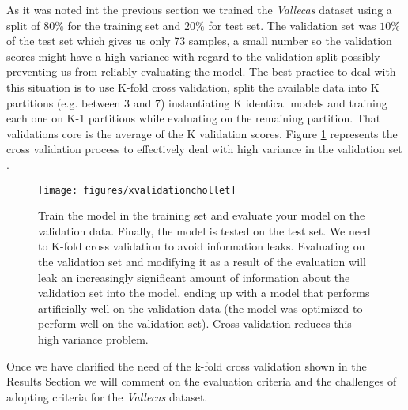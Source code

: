 \documentclass[11pt]{article}
\theoremstyle{definition}
\theoremstyle{remark}
\begin{document}
As it was noted int the previous section we trained the \emph{Vallecas} dataset using a split of $80\%$ for the training set and $20\%$ for test set. The validation set was $10\%$ of the test set which gives us only 73 samples, a small number so the validation scores might have a high variance with regard to the validation split possibly preventing us from reliably evaluating the model. The best practice to deal with this situation is to use K-fold cross validation, split the available data into K partitions (e.g. between 3 and 7) instantiating K identical models and training each one on K-1 partitions while evaluating on the remaining partition. That validations core is the average of the K validation scores. Figure \ref{fig:xvalchollet} represents the cross validation process to effectively deal with high variance in the validation set \cite{chollet2017deep}. 
\begin{figure}[H]
        \centering
        \texttt{[image: figures/xvalidationchollet]}
        \caption{Train the model in the training set and evaluate your model on the validation data. Finally, the model is tested on the test set. We need to K-fold cross validation to avoid information leaks. Evaluating on the validation set and modifying it as a result of the evaluation will leak an increasingly significant amount of information about the validation set into the model, ending up with a model that performs artificially well on the validation data (the model was optimized to perform well on the validation set). Cross validation reduces this high variance problem.} \label{fig:xvalchollet}
\end{figure}

Once we have clarified the need of the k-fold cross validation shown in the Results Section we will comment on the evaluation criteria and the challenges of adopting criteria for the \emph{Vallecas} dataset.
\end{document}

